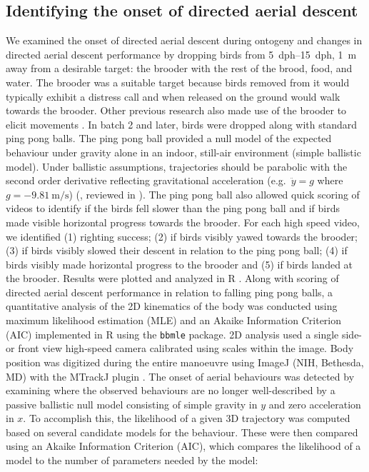 \documentclass[10pt]{article}
\begin{document}
\subsection{Identifying the onset of directed aerial descent}
	We examined the onset of directed aerial descent during ontogeny and changes in directed aerial descent performance by dropping birds from \SIrange{5}{15}{dph}, \SI{1}{\meter} away from a desirable target: the brooder with the rest of the brood, food, and water. The brooder was a suitable target because birds removed from it would typically exhibit a distress call and when released on the ground would walk towards the brooder.  Other previous research also made use of the brooder to elicit movements \citep{Jackson:2009}.  
	In batch 2 and later, birds were dropped along with standard ping pong balls. The ping pong ball provided a null model of the expected behaviour under gravity alone in an indoor, still-air environment (simple ballistic model).  Under ballistic assumptions, trajectories should be parabolic with the second order derivative reflecting gravitational acceleration (e.g.\ $\ddot y = g$ where $g=\SI{-9.81}{\meter\per\second}$) (\citealp{Galileo:1638}, reviewed in \citealp{Naylor:1980}).  The ping pong ball also allowed quick scoring of videos to identify if the birds fell slower than the ping pong ball and if birds made visible horizontal progress towards the brooder. For each high speed video, we identified (1) righting success; (2) if birds visibly yawed towards the brooder; (3) if birds visibly slowed their descent in relation to the ping pong ball; (4) if birds visibly made horizontal progress to the brooder and (5) if birds landed at the brooder. Results were plotted and analyzed in R \citep{R:2013}.
	Along with scoring of directed aerial descent performance in relation to falling ping pong balls, a quantitative analysis of the 2D kinematics of the body was conducted using maximum likelihood estimation (MLE) and an Akaike Information Criterion (AIC) \citep{Akaike:1974, Burnham:2002, Burnham:2011} implemented in R \citep{R:2013} using the \texttt{bbmle} package.  2D analysis used a single side- or front view high-speed camera calibrated using scales within the image. Body position was digitized during the entire manoeuvre using ImageJ (NIH, Bethesda, MD) with the MTrackJ plugin \citep{Meijering:2012}.  
	The onset of aerial behaviours was detected by examining where the observed behaviours are no longer well-described by a passive ballistic null model consisting of simple gravity in $y$ and zero acceleration in $x$.  To accomplish this, the likelihood of a given 3D trajectory was computed based on several candidate models for the behaviour.  These were then compared using an Akaike Information Criterion (AIC), which compares the likelihood of a model to the number of parameters needed by the model:  
\end{document}

